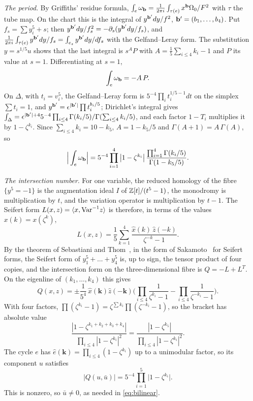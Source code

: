 \emph{The period.} By Griffiths' residue formula,
$\int_e\omega_{\mathbf{b}}=\frac1{2\pi i}\int_{\tau(e)}x^{\mathbf{b}}\Omega_0/F^2$ with
$\tau$ the tube map. On the chart this is the integral of
$y^{\mathbf{b}'}dy/f^2$, $\mathbf{b}'=(b_1,\dots,b_4)$. Put $f_s=\sum y_i^5+s$; then
$y^{\mathbf{b}'}dy/f_s^2=-\partial_s(y^{\mathbf{b}'}dy/f_s)$, and
$\frac1{2\pi i}\int_{\tau(e)}y^{\mathbf{b}'}dy/f_s=\int_{e_s}y^{\mathbf{b}'}dy/df_s$
with the Gelfand--Leray form. The substitution $y=s^{1/5}u$ shows that the
last integral is $s^{A}P$ with $A=\frac15\sum_{i\le4}k_i-1$ and $P$ its value
at $s=1$. Differentiating at $s=1$,
\[
\int_e\omega_{\mathbf{b}}=-A\,P.
\]
On $\Delta$, with $t_i=v_i^5$, the Gelfand--Leray form is
$5^{-4}\prod_it_i^{1/5-1}dt$ on the simplex $\sum t_i=1$, and
$y^{\mathbf{b}'}=\epsilon^{|\mathbf{b}'|}\prod t_i^{b_i/5}$; Dirichlet's integral gives
$\int_\Delta=\epsilon^{|\mathbf{b}'|+4}5^{-4}\prod_{i\le4}\Gamma(k_i/5)/
\Gamma(\sum_{i\le4}k_i/5)$, and each factor $1-T_i$ multiplies it by
$1-\zeta^{k_i}$. Since $\sum_{i\le4}k_i=10-k_5$, $A=1-k_5/5$ and
$\Gamma(A+1)=A\,\Gamma(A)$, so
\begin{equation}\label{eq:period}
\Big|\int_e\omega_{\mathbf{b}}\Big|=5^{-4}\prod_{i=1}^4\big|1-\zeta^{k_i}\big|
\,\frac{\prod_{i=1}^4\Gamma(k_i/5)}{\Gamma(1-k_5/5)}.
\end{equation}

\emph{The intersection number.} For one variable, the reduced homology of
the fibre $\{y^5=-1\}$ is the augmentation ideal $I$ of $\mathbb{Z}[t]/(t^5-1)$,
the monodromy is multiplication by $t$, and the variation operator is
multiplication by $t-1$. The Seifert form $L(x,z)=\langle x,\mathrm{Var}^{-1}z\rangle$
is therefore, in terms of the values $\hat x(k)=x(\zeta^k)$,
\[
L(x,z)=\frac15\sum_{k=1}^4\frac{\hat x(k)\,\hat z(-k)}{\zeta^{-k}-1}.
\]
By the theorem of Sebastiani and Thom~\cite{ST71}, in the form of
Sakamoto~\cite{Sak74} for Seifert forms, the Seifert form of
$y_1^5+\dots+y_4^5$ is, up to sign, the tensor product of four copies, and
the intersection form on the three-dimensional fibre is $Q=-L+L^{T}$. On the
eigenline of $(k_1,\dots,k_4)$ this gives
\[
Q(x,z)=\pm\frac1{5^4}\,\hat x(\mathbf k)\hat z(-\mathbf k)\Big(
\prod_{i\le4}\frac1{\zeta^{k_i}-1}-\prod_{i\le4}\frac1{\zeta^{-k_i}-1}\Big).
\]
With four factors, $\prod(\zeta^{k_i}-1)=\zeta^{\sum k_i}\prod(\zeta^{-k_i}
-1)$, so the bracket has absolute value
\[
\frac{|1-\zeta^{k_1+k_2+k_3+k_4}|}{\prod_{i\le4}|1-\zeta^{k_i}|^2}
=\frac{|1-\zeta^{k_5}|}{\prod_{i\le4}|1-\zeta^{k_i}|^2}.
\] The cycle $e$ has
$\hat e(\mathbf k)=\prod_{i\le4}(1-\zeta^{k_i})$ up to a unimodular factor,
so its component $u$ satisfies
\begin{equation}\label{eq:intersection}
|Q(u,\bar u)|=5^{-4}\prod_{i=1}^5\big|1-\zeta^{k_i}\big|.
\end{equation}
This is nonzero, so $\bar u\ne0$, as needed in \eqref{eq:bilinear}.

